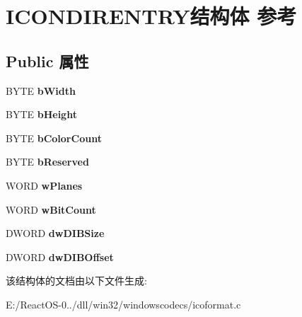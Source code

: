 \hypertarget{struct_i_c_o_n_d_i_r_e_n_t_r_y}{}\section{I\+C\+O\+N\+D\+I\+R\+E\+N\+T\+R\+Y结构体 参考}
\label{struct_i_c_o_n_d_i_r_e_n_t_r_y}
\subsection*{Public 属性}
\begin{DoxyCompactItemize}
\item 
\mbox{\label{struct_i_c_o_n_d_i_r_e_n_t_r_y_aaee7919069c116a83e1031d79bbbf194}} 
B\+Y\+TE {\bfseries b\+Width}
\item 
\mbox{\label{struct_i_c_o_n_d_i_r_e_n_t_r_y_aa86ad6a2f4fe5920d69c41698a281d8d}} 
B\+Y\+TE {\bfseries b\+Height}
\item 
\mbox{\label{struct_i_c_o_n_d_i_r_e_n_t_r_y_a96e9de57942f7a986082bc17e8918180}} 
B\+Y\+TE {\bfseries b\+Color\+Count}
\item 
\mbox{\label{struct_i_c_o_n_d_i_r_e_n_t_r_y_a033c42e817c491996c302443cb77c342}} 
B\+Y\+TE {\bfseries b\+Reserved}
\item 
\mbox{\label{struct_i_c_o_n_d_i_r_e_n_t_r_y_a4680c60f0176285dbd7858a997829998}} 
W\+O\+RD {\bfseries w\+Planes}
\item 
\mbox{\label{struct_i_c_o_n_d_i_r_e_n_t_r_y_a790602749f8aa0d03f485b159a7f2a90}} 
W\+O\+RD {\bfseries w\+Bit\+Count}
\item 
\mbox{\label{struct_i_c_o_n_d_i_r_e_n_t_r_y_a679ece35b01cb2ab6cb854fecba52388}} 
D\+W\+O\+RD {\bfseries dw\+D\+I\+B\+Size}
\item 
\mbox{\label{struct_i_c_o_n_d_i_r_e_n_t_r_y_aac3da0d0dac7cf41d324155450861654}} 
D\+W\+O\+RD {\bfseries dw\+D\+I\+B\+Offset}
\end{DoxyCompactItemize}


该结构体的文档由以下文件生成\+:\begin{DoxyCompactItemize}
\item 
E\+:/\+React\+O\+S-\/0../dll/win32/windowscodecs/icoformat.\+c\end{DoxyCompactItemize}
